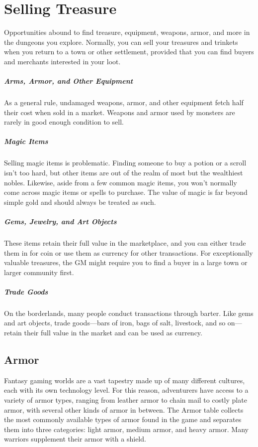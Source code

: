 \section{Selling Treasure}

Opportunities abound to find treasure, equipment, weapons, armor, and more in the dungeons you explore. Normally, you can sell your treasures and trinkets when you return to a town or other settlement, provided that you can find buyers and merchants interested in your loot.

\subparagraph*{Arms, Armor, and Other Equipment} As a general rule, undamaged weapons, armor, and other equipment fetch half their cost when sold in a market. Weapons and armor used by monsters are rarely in good enough condition to sell.

\subparagraph*{Magic Items} Selling magic items is problematic. Finding someone to buy a potion or a scroll isn't too hard, but other items are out of the realm of most but the wealthiest nobles. Likewise, aside from a few common magic items, you won't normally come across magic items or spells to purchase. The value of magic is far beyond simple gold and should always be treated as such.

\subparagraph*{Gems, Jewelry, and Art Objects} These items retain their full value in the marketplace, and you can either trade them in for coin or use them as currency for other transactions. For exceptionally valuable treasures, the GM might require you to find a buyer in a large town or larger community first.

\subparagraph*{Trade Goods} On the borderlands, many people conduct transactions through barter. Like gems and art objects, trade goods—bars of iron, bags of salt, livestock, and so on—retain their full value in the market and can be used as currency.

\subsection{Armor}

Fantasy gaming worlds are a vast tapestry made up of many different cultures, each with its own technology level. For this reason, adventurers have access to a variety of armor types, ranging from leather armor to chain mail to costly plate armor, with several other kinds of armor in between. The Armor table collects the most commonly available types of armor found in the game and separates them into three categories: light armor, medium armor, and heavy armor. Many warriors supplement their armor with a shield.

